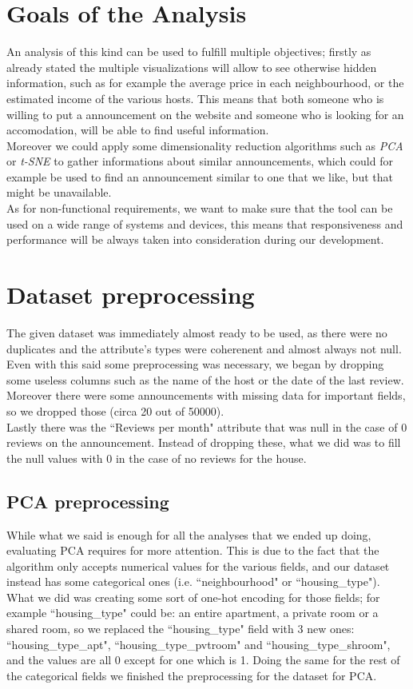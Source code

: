 \documentclass[11pt]{article}
\begin{document}
\section{Goals of the Analysis}
An analysis of this kind can be used to fulfill multiple objectives; firstly as already stated the multiple visualizations will allow to see otherwise hidden information, such as for example the average price in each neighbourhood, or the estimated income of the various hosts. This means that both someone who is willing to put a announcement on the website and someone who is looking for an accomodation, will be able to find useful information.\\
Moreover we could apply some dimensionality reduction algorithms such as {\em PCA} or {\em t-SNE} to gather informations about similar announcements, which could for example be used to find an announcement similar to one that we like, but that might be unavailable.\\
As for non-functional requirements, we want to make sure that the tool can be used on a wide range of systems and devices, this means that responsiveness and performance will be always taken into consideration during our development.

\section{Dataset preprocessing}
The given dataset was immediately almost ready to be used, as there were no duplicates and the attribute's types were coherenent and almost always not null.\\
Even with this said some preprocessing was necessary, we began by dropping some useless columns such as the name of the host or the date of the last review. Moreover there were some announcements with missing data for important fields, so we dropped those (circa 20 out of 50000).\\
Lastly there was the ``Reviews per month" attribute that was null in the case of 0 reviews on the announcement. Instead of dropping these, what we did was to fill the null values with 0 in the case of no reviews for the house.

\subsection{PCA preprocessing}
While what we said is enough for all the analyses that we ended up doing, evaluating PCA requires for more attention. This is due to the fact that the algorithm only accepts numerical values for the various fields, and our dataset instead has some categorical ones (i.e. ``neighbourhood" or ``housing\_type"). What we did was creating some sort of one-hot encoding for those fields; for example ``housing\_type" could be: an entire apartment, a private room or a shared room, so we replaced the ``housing\_type" field with 3 new ones: ``housing\_type\_apt", ``housing\_type\_pvtroom" and ``housing\_type\_shroom", and the values are all 0 except for one which is 1. Doing the same for the rest of the categorical fields we finished the preprocessing for the dataset for PCA.\\
\end{document}
